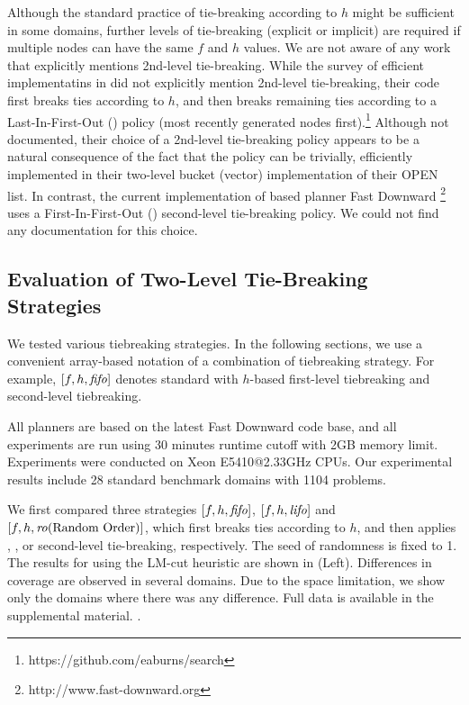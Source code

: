 Although the standard practice of tie-breaking according to $h$ might be sufficient in some domains, further levels of tie-breaking (explicit or implicit) are required if multiple nodes can have the same $f$ and $h$ values.
We are not aware of any work that explicitly mentions 2nd-level tie-breaking.
While the survey of efficient \astar implementatins in \citeauthor{burns2012implementing} did not explicitly mention 2nd-level tie-breaking, their code first breaks ties according to $h$, and then breaks remaining ties according to a Last-In-First-Out (\lifo) policy (most recently generated nodes first).\footnote{https://github.com/eaburns/search}
Although not documented, their choice of a \lifo 2nd-level tie-breaking policy appears to be a natural consequence of the fact that the \lifo policy can be trivially, efficiently implemented in their two-level bucket (vector) implementation of their OPEN list.
In contrast, the current implementation of \sota \astar based planner Fast
Downward \cite{Helmert2006}\footnote{http://www.fast-downward.org} uses a First-In-First-Out (\fifo) second-level tie-breaking policy. We could not find any documentation for this choice. 


\subsection{Evaluation of Two-Level Tie-Breaking Strategies}


We tested various tiebreaking strategies. In the following sections, we
use a convenient array-based notation of a combination of tiebreaking
strategy.  For example, $[f,h,\mbox{\textit{fifo}}]$ denotes standard \astar with
$h$-based first-level tiebreaking and \fifo
second-level tiebreaking.

All planners are based on the latest Fast Downward code base, and all
experiments are run using 30 minutes runtime cutoff with 2GB memory
limit. Experiments were conducted on Xeon E5410@2.33GHz CPUs.
Our experimental results include 28 standard benchmark domains with 1104
problems.

We first compared three strategies 
$[f,h,\mbox{\textit{fifo}}]$, $[f,h,\mbox{\textit{lifo}}]$ and $[f,h,\mbox{\textit{ro}}\mbox{(Random Order)}]$, 
which first breaks ties according to $h$, and then applies \fifo, \lifo,
or \ro second-level tie-breaking, respectively. The seed of randomness
is fixed to 1.
% 
The results for \astar using the LM-cut heuristic \cite{Helmert2009} are
shown in  (Left).
Differences in coverage are observed in several domains.
Due to the space limitation, we show only the domains
where there was any difference. Full data is available in the
supplemental material. .
 
